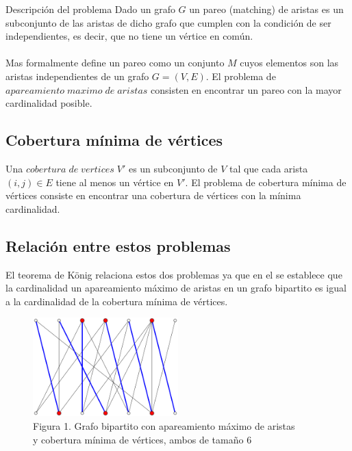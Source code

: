 \documentclass[12pt,a4paper]{article}
\begin{document}
\begin{section}{Descripción del problema} \noindent 
Dado un grafo $G$ un pareo (matching) de aristas es un subconjunto de las aristas de dicho grafo que cumplen con la condición de ser independientes, es decir, que no tiene un vértice en común\cite{le2014algorithms}.\\\\
Mas formalmente \cite{butenko2003maximum} define un pareo como un conjunto $M$ cuyos elementos son las aristas independientes de un grafo $G=(V,E)$. El problema de $apareamiento\; maximo\; de\; aristas$ consisten en encontrar un pareo con la mayor cardinalidad posible.

\subsection{Cobertura mínima de vértices} \noindent 
Una $cobertura\; de\; vertices\; V'$ es un subconjunto de $V$ tal que cada arista $(i,j) \in E$ tiene al menos un vértice en $V'$. El problema de cobertura mínima de vértices consiste en encontrar una cobertura de vértices con la mínima cardinalidad\cite{butenko2003maximum}.

\subsection{Relación entre estos problemas} \noindent 
El teorema de König relaciona estos dos problemas ya que en el se establece que la cardinalidad un apareamiento máximo de aristas en un grafo bipartito es igual a la cardinalidad de la cobertura mínima de vértices\cite{rizzi2000short}. 

\begin{center}
	\begin{figure}[h]
		\centering
		\captionsetup{justification=centering}
		\includegraphics[width=0.50\textwidth]{images/Konigs-theorem-graph.png}
		\caption*{
			\footnotesize Figura 1. Grafo bipartito con apareamiento máximo de aristas \\y 		cobertura mínima de vértices, ambos de tamaño 6
		}
	\end{figure}
\end{center}
\end{section}
\end{document}
